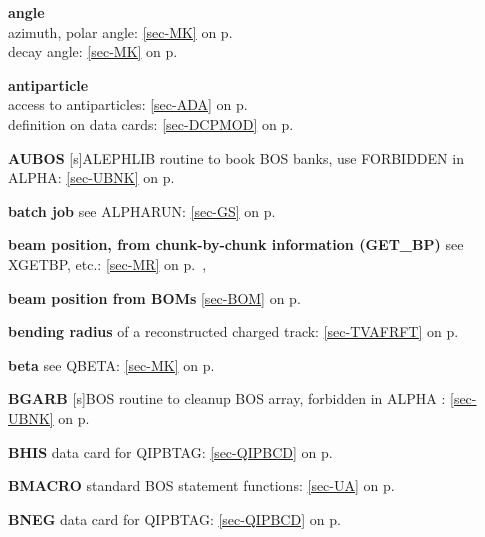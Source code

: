  \item{\bf angle   }\\
 \subitem azimuth, polar angle: \ref{sec-MK} on p.~\pageref{sec-MK}\\
 \subitem decay angle: \ref{sec-MK} on p.~\pageref{sec-MK}\\
 \item{\bf antiparticle    }\\
 \subitem access to antiparticles: \ref{sec-ADA} on p.~\pageref{sec-ADA}\\
 \subitem definition on data cards: \ref{sec-DCPMOD} on p.~\pageref{sec-DCPMOD}\\
 \item{\bf AUBOS }[s]ALEPHLIB routine to book BOS banks, use FORBIDDEN in ALPHA:
 \ref{sec-UBNK} on p.~\pageref{sec-UBNK}
 
 \item{\bf batch job   }see ALPHARUN: \ref{sec-GS} on p.~\pageref{sec-GS}\\
 \item{\bf beam position, from chunk-by-chunk information (GET\_BP)} see XGETBP, etc.: \ref{sec-MR} on
 p.~\pageref{sec-MR},\\
 \item{\bf beam position from BOMs} \ref{sec-BOM} on p.~\pageref{sec-BOM}\\
 \item{\bf bending radius  }of a reconstructed charged track:
 \ref{sec-TVAFRFT} on p.~\pageref{sec-TVAFRFT}\\
 \item{\bf beta    }see QBETA: \ref{sec-MK} on p.~\pageref{sec-MK}\\
 \item{\bf BGARB }[s]BOS routine to cleanup BOS array, forbidden in ALPHA :
 \ref{sec-UBNK} on p.~\pageref{sec-UBNK}\\
 \item{\bf BHIS    }data card for QIPBTAG: \ref{sec-QIPBCD} on p.~\pageref{sec-QIPBCD}
 
 \item{\bf BMACRO  }standard BOS statement functions:  \ref{sec-UA} on p.~\pageref{sec-UA}\\
 \item{\bf BNEG    }data card for QIPBTAG: \ref{sec-QIPBCD} on p.~\pageref{sec-QIPBCD}
 
